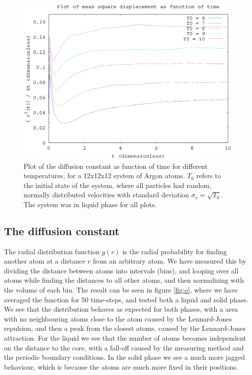 \begin{figure}[h!]
    \centering
    \includegraphics[width =.70\textwidth]{bilder/n_plot01.eps}
    \parbox{4in} {
        \caption{
            \small{
                Plot of the diffusion constant as function of time for different temperatures, for a 12x12x12 system of Argon atoms. $T_0$ refers to the initial state of the system, where all particles had random, normally distributed velocities with standard deviation $\sigma_v = \sqrt{T_0}$. The system was in liquid phase for all plots.
            }
            \label{fig:n}
        }
    }
\end{figure}

\subsection*{The diffusion constant}
The radial distribution function $g(r)$ is the radial probability for finding another atom at a distance $r$ from an arbitrary atom. We have measured this by dividing the distance between atoms into intervals (bins), and looping over all atoms while finding the distances to all other atoms, and then normalizing with the volume of each bin. The result can be seen in figure \ref{fig:o}, where we have averaged the function for 50 time-steps, and tested both a liquid and solid phase. We see that the distribution behaves as expected for both phases, with a area with no neighbouring atoms close to the atom caused by the Lennard-Jones repulsion, and then a peak from the closest atoms, caused by the Lennard-Jones attraction. For the liquid we see that the number of atoms becomes independent on the distance to the core, with a fall-off caused by the measuring method and the periodic boundary conditions. In the solid phase we see a much more jagged behaviour, which is because the atoms are much more fixed in their positions.

